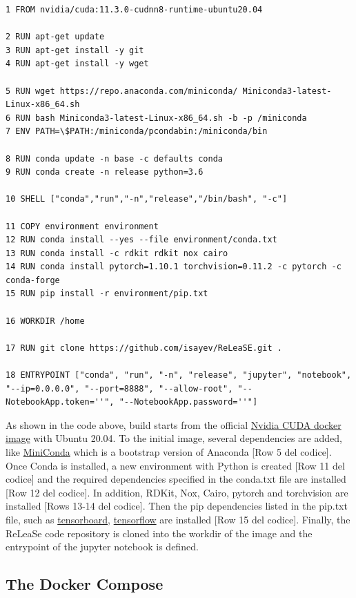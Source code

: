 \documentclass[a4paper]{article}
\begin{document}
\begin{lstlisting}
1 FROM nvidia/cuda:11.3.0-cudnn8-runtime-ubuntu20.04

2 RUN apt-get update
3 RUN apt-get install -y git
4 RUN apt-get install -y wget

5 RUN wget https://repo.anaconda.com/miniconda/ Miniconda3-latest-Linux-x86_64.sh
6 RUN bash Miniconda3-latest-Linux-x86_64.sh -b -p /miniconda
7 ENV PATH=\$PATH:/miniconda/pcondabin:/miniconda/bin

8 RUN conda update -n base -c defaults conda
9 RUN conda create -n release python=3.6

10 SHELL ["conda","run","-n","release","/bin/bash", "-c"]

11 COPY environment environment
12 RUN conda install --yes --file environment/conda.txt
13 RUN conda install -c rdkit rdkit nox cairo
14 RUN conda install pytorch=1.10.1 torchvision=0.11.2 -c pytorch -c conda-forge
15 RUN pip install -r environment/pip.txt

16 WORKDIR /home

17 RUN git clone https://github.com/isayev/ReLeaSE.git .

18 ENTRYPOINT ["conda", "run", "-n", "release", "jupyter", "notebook", "--ip=0.0.0.0", "--port=8888", "--allow-root", "--NotebookApp.token=''", "--NotebookApp.password=''"]
\end{lstlisting}

As shown in the code above, build starts from the official \href{https://hub.docker.com/r/nvidia/cuda}{Nvidia CUDA docker image} with Ubuntu 20.04. To the initial image, several dependencies are added, like \href{https://docs.conda.io/en/latest/miniconda.html}{MiniConda} which is a bootstrap version of Anaconda [Row 5 del codice].
Once Conda is installed, a new environment with Python is created [Row 11 del codice] and the required dependencies specified in the conda.txt file are installed [Row 12 del codice]. In addition, RDKit, Nox, Cairo, pytorch and torchvision are installed [Rows 13-14 del codice]. 
Then the pip dependencies listed in the pip.txt file, such as \href{https://www.tensorflow.org/tensorboard}{tensorboard}, \href{https://www.tensorflow.org/}{tensorflow} are installed [Row 15 del codice].
Finally, the ReLeaSe code repository is cloned into the workdir of the image and the entrypoint of the jupyter notebook is defined.

\subsection{The Docker Compose}\label{sec:The Docker Compose}
\end{document}
